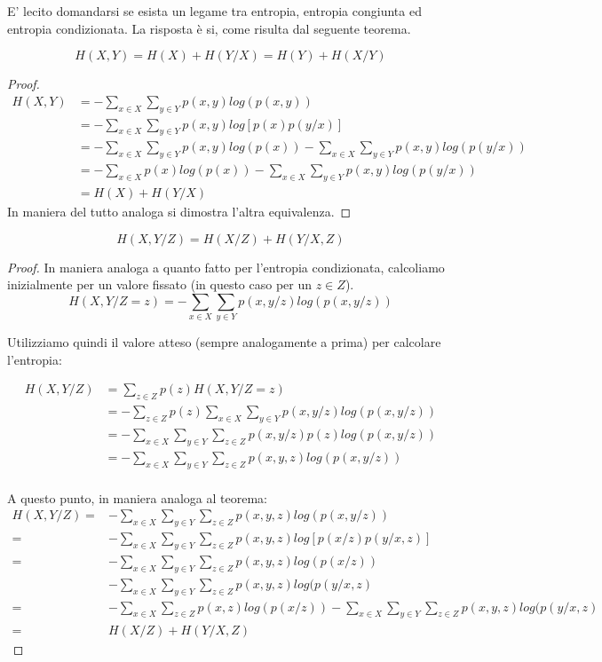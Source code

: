 E' lecito domandarsi se esista un legame tra entropia, entropia congiunta ed entropia condizionata.
La risposta è si, come risulta dal seguente teorema.

\begin{teorema}
 \[ H(X,Y)=H(X)+H(Y/X)=H(Y)+H(X/Y) \]
 \begin{proof}
  \[
   \begin{split}
    H(X,Y) &=  -\sum_{x \in X} \sum_{y \in Y} p(x,y) log(p(x,y))  \\
         &= -\sum_{x \in X} \sum_{y \in Y} p(x,y) log \left [p(x) p(y/x) \right] \\
         &= -\sum_{x \in X} \sum_{y \in Y} p(x,y)log(p(x)) - \sum_{x \in X} \sum_{y \in Y} p(x,y)log(p(y/x)) \\
         &= -\sum_{x \in X} p(x)log(p(x)) - \sum_{x \in X} \sum_{y \in Y} p(x,y)log(p(y/x)) \\
         &= H(X) + H(Y/X)
  \end{split}
  \]
  In maniera del tutto analoga si dimostra l'altra equivalenza.
 \end{proof}
\label{catena}
\end{teorema}

\begin{corollario}
\[
 H(X,Y/Z)=H(X/Z)+H(Y/X,Z)
\]
\begin{proof}
In maniera analoga a quanto fatto per l'entropia condizionata, calcoliamo inizialmente per un valore fissato 
(in questo caso per un $z \in Z$).
\[
 H(X,Y/Z=z)=-\sum_{x \in X} \sum_{y \in Y} p(x,y/z) log(p(x,y/z))
\]

\noindent
Utilizziamo quindi il valore atteso (sempre analogamente a prima) per calcolare l'entropia:

\[\begin{split}
 H(X,Y/Z)&=\sum_{z \in Z} p(z) H(X,Y/Z=z) \\
 &=-\sum_{z \in Z} p(z) \sum_{x \in X} \sum_{y \in Y} p(x,y/z) log(p(x,y/z)) \\
 &=-\sum_{x \in X} \sum_{y \in Y} \sum_{z \in Z} p(x,y/z) p(z) log(p(x,y/z)) \\ 
 &=-\sum_{x \in X} \sum_{y \in Y} \sum_{z \in Z} p(x,y,z) log(p(x,y/z)) \\
 \end{split}
\]

A questo punto, in maniera analoga al teorema:
\[\begin{split}
 H(X,Y/Z)=&-\sum_{x \in X} \sum_{y \in Y} \sum_{z \in Z} p(x,y,z) log(p(x,y/z)) \\
 =&-\sum_{x \in X} \sum_{y \in Y} \sum_{z \in Z} p(x,y,z) log[p(x/z) p(y/x,z)] \\
 =&-\sum_{x \in X} \sum_{y \in Y} \sum_{z \in Z} p(x,y,z) log(p(x/z)) \\
   &-\sum_{x \in X} \sum_{y \in Y} \sum_{z \in Z} p(x,y,z)log(p(y/x,z) \\
 =&-\sum_{x \in X} \sum_{z \in Z} p(x,z) log(p(x/z)) -\sum_{x \in X} \sum_{y \in Y} \sum_{z \in Z} p(x,y,z)log(p(y/x,z) \\
 =& H(X/Z)+H(Y/X,Z)
 \end{split}
\]
\end{proof}
\end{corollario}


